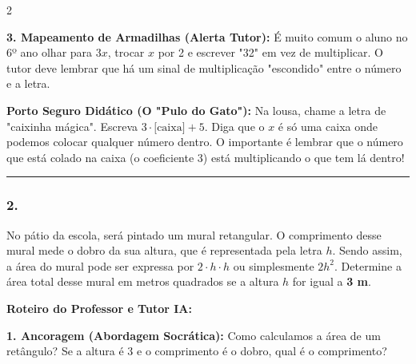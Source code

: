 \begin{multicols*}{2}
\begin{tcolorbox}[colback=CorTitUm!5, colframe=CorTitUm, boxrule=1pt, arc=4pt, left=6pt, right=6pt, top=6pt, bottom=6pt]
    \textbf{3. Mapeamento de Armadilhas (Alerta Tutor):} É muito comum o aluno no 6º ano olhar para $3x$, trocar $x$ por 2 e escrever "32" em vez de multiplicar. O tutor deve lembrar que há um sinal de multiplicação "escondido" entre o número e a letra.
    \end{tcolorbox}
    \vspace{0.15cm}
    
    \begin{boxexplicacao}
    \textbf{Porto Seguro Didático (O "Pulo do Gato"):} Na lousa, chame a letra de "caixinha mágica". Escreva $3 \cdot \text{[caixa]} + 5$. Diga que o $x$ é só uma caixa onde podemos colocar qualquer número dentro. O importante é lembrar que o número que está colado na caixa (o coeficiente 3) está multiplicando o que tem lá dentro!
    \end{boxexplicacao}
\fi

\par\vspace{\espacoQuestao}

\noindent\textcolor{CorLinha}{\rule{\linewidth}{0.5pt}} 
\par\vspace{\espacoPreQuestao}
\subsubsection*{2.} 
\begin{enunciadoLiteral}
No pátio da escola, será pintado um mural retangular. O comprimento desse mural mede o dobro da sua altura, que é representada pela letra $h$. Sendo assim, a área do mural pode ser expressa por $ 2 \cdot h \cdot h $ ou simplesmente $ 2h^2 $. Determine a área total desse mural em metros quadrados se a altura $h$ for igual a \textbf{3 m}.
\end{enunciadoLiteral}

\ifgabarito
    \begin{tcolorbox}[colback=CorTitUm!5, colframe=CorTitUm, boxrule=1pt, arc=4pt, left=6pt, right=6pt, top=6pt, bottom=6pt]
    \small\textbf{\textcolor{CorTitUm}{Roteiro do Professor e Tutor IA:}}\par\vspace{0.1cm}
    \color{CinzaEscuro}
    \textbf{1. Ancoragem (Abordagem Socrática):} Como calculamos a área de um retângulo? Se a altura é 3 e o comprimento é o dobro, qual é o comprimento?\par\vspace{0.1cm}
    

\end{tcolorbox}
\end{multicols*}
